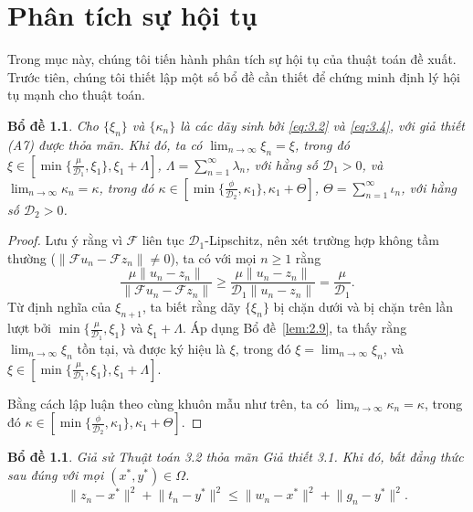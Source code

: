 \documentclass{MyBook}
\theoremstyle{plain}
\newtheorem{lemma}[theorem]{Bổ đề}
\theoremstyle{definition}
\theoremstyle{remark}
\numberwithin{equation}{chapter}
\newcommand{\Fc}{\mathcal{F}}
\newcommand{\Dc}{\mathcal{D}}
\newcommand{\nm}[1]{\lVert #1\rVert}
\begin{document}
\chapter{Phân tích sự hội tụ}\label{sec:conv}

Trong mục này, chúng tôi tiến hành phân tích sự hội tụ của thuật toán đề xuất. Trước tiên, chúng tôi thiết lập một số bổ đề cần thiết để chứng minh định lý hội tụ mạnh cho thuật toán.

\begin{lemma}\label{lem:4.1}
Cho $\{\xi_n\}$ và $\{\kappa_n\}$ là các dãy sinh bởi \eqref{eq:3.2} và \eqref{eq:3.4}, với giả thiết (A7) được thỏa mãn. Khi đó, ta có $\displaystyle\lim_{n\to\infty}\xi_n=\xi$, trong đó $\xi\in[\min\{\tfrac{\mu}{\Dc_1},\xi_1\},\xi_1+\Lambda]$, $\Lambda=\sum_{n=1}^{\infty}\lambda_n$, với hằng số $\Dc_1>0$, và $\displaystyle\lim_{n\to\infty}\kappa_n=\kappa$, trong đó $\kappa\in[\min\{\tfrac{\phi}{\Dc_2},\kappa_1\},\kappa_1+\Theta]$, $\Theta=\sum_{n=1}^{\infty}\iota_n$, với hằng số $\Dc_2>0$.
\end{lemma}

\begin{proof}
Lưu ý rằng vì $\Fc$ liên tục $\Dc_1$-Lipschitz, nên xét trường hợp không tầm thường ($\nm{\Fc u_n-\Fc z_n}\ne 0$), ta có với mọi $n\ge 1$ rằng
\[
\frac{\mu\nm{u_n-z_n}}{\nm{\Fc u_n-\Fc z_n}}\ge\frac{\mu\nm{u_n-z_n}}{\Dc_1\nm{u_n-z_n}}=\frac{\mu}{\Dc_1}.
\]
Từ định nghĩa của $\xi_{n+1}$, ta biết rằng dãy $\{\xi_n\}$ bị chặn dưới và bị chặn trên lần lượt bởi $\min\{\tfrac{\mu}{\Dc_1},\xi_1\}$ và $\xi_1+\Lambda$. Áp dụng Bổ đề~\ref{lem:2.9}, ta thấy rằng $\lim_{n\to\infty}\xi_n$ tồn tại, và được ký hiệu là $\xi$, trong đó $\xi=\lim_{n\to\infty}\xi_n$, và $\xi\in[\min\{\tfrac{\mu}{\Dc_1},\xi_1\},\xi_1+\Lambda]$.

Bằng cách lập luận theo cùng khuôn mẫu như trên, ta có $\lim_{n\to\infty}\kappa_n=\kappa$, trong đó $\kappa\in[\min\{\tfrac{\phi}{\Dc_2},\kappa_1\},\kappa_1+\Theta]$.
\end{proof}

\begin{lemma}\label{lem:4.2}
Giả sử Thuật toán 3.2 thỏa mãn Giả thiết 3.1. Khi đó, bất đẳng thức sau đúng với mọi $(x^{*},y^{*})\in\Omega$.
\[
\nm{z_n-x^{*}}^2+\nm{t_n-y^{*}}^2\le\nm{w_n-x^{*}}^2+\nm{g_n-y^{*}}^2.
\]
\end{lemma}
\end{document}
